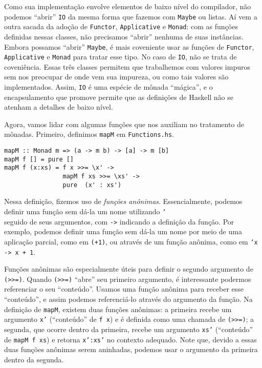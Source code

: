 \documentclass[a4paper]{article}
\begin{document}
Como sua implementação envolve elementos de baixo nível do compilador, não podemos ``abrir'' \texttt{IO} da mesma forma que fazemos com \texttt{Maybe} ou listas.
Aí vem a outra sacada da adoção de \texttt{Functor}, \texttt{Applicative} e \texttt{Monad}:
com as funções definidas nessas classes, não precisamos ``abrir'' nenhuma de suas instâncias.
Embora possamos ``abrir'' \texttt{Maybe}, é mais coveniente usar as funções de \texttt{Functor}, \texttt{Applicative} e \texttt{Monad} para tratar esse tipo.
No caso de \texttt{IO}, não se trata de coveniência.
Essas três classes permitem que trabalhemos com valores impuros sem nos preocupar de onde vem sua impureza, ou como tais valores são implementados.
Assim, \texttt{IO} é uma espécie de mônada ``mágica'', e o encapsulamento que promove permite que as definições de Haskell não se atenham a detalhes de baixo nível.

Agora, vamos lidar com algumas funções que nos auxiliam no tratamento de mônadas.
Primeiro, definimos \texttt{mapM} em \texttt{Functions.hs}.

\begin{verbatim}
mapM :: Monad m => (a -> m b) -> [a] -> m [b]
mapM f [] = pure []
mapM f (x:xs) = f x >>= \x' ->
                mapM f xs >>= \xs' ->
                pure  (x' : xs')
\end{verbatim}

Nessa definição, fizemos uso de \emph{funções anônimas}.
Essencialmente, podemos definir uma função sem dá-la um nome utilizando \texttt{\char`\\} seguido de seus argumentos, com \texttt{->} indicando a definição da função.
Por exemplo, podemos definir uma função sem dá-la um nome por meio de uma aplicação parcial, como em \texttt{(+1)}, ou através de um função anônima, como em \mbox{\texttt{\char`\\x -> x + 1}}.

Funções anônimas são especialmente úteis para definir o segundo argumento de \texttt{(>>=)}.
Quando \texttt{(>>=)} ``abre'' seu primeiro argumento, é interessante podermos referenciar o seu ``conteúdo''.
Usamos uma função anônima para receber esse ``conteúdo'', e assim podemos referenciá-lo através do argumento da função.
Na definição de \texttt{mapM}, existem duas funções anônimas:
a primeira recebe um argumento \texttt{x'} (``conteúdo'' de \texttt{f x}) e é definida como uma chamada de \texttt{(>>=)};
a segunda, que ocorre dentro da primeira, recebe um argumento \texttt{xs'} (``conteúdo'' de \texttt{mapM f xs}) e retorna \texttt{x':xs'} no contexto adequado.
Note que, devido a essas duas funções anônimas serem aninhadas, podemos usar o argumento da primeira dentro da segunda.
\end{document}
